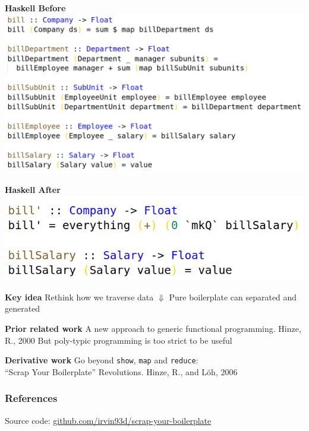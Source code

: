 \documentclass[14pt]{beamer}
\begin{document}
\begin{frame}
  \textbf{Haskell Before}
  \vfill
  \includegraphics[height=0.8\textheight,width=\textwidth,keepaspectratio]{graphics/bill-naive-hs.png}
  \vfill
\end{frame}

\begin{frame}
  \textbf{Haskell After}
  \vfill
  \includegraphics[height=0.8\textheight,width=\textwidth,keepaspectratio]{graphics/bill-hs.png}
  \vfill
\end{frame}

\begin{frame}
  \vfill
  \textbf{Key idea}
  \vfill
  \centering
  Rethink how we traverse data
  \vfill
  $\Downarrow$
  \vfill
  Pure boilerplate can separated and generated
  \vfill
\end{frame}

\begin{frame}
  \textbf{Prior related work}
  \vfill
  A new approach to generic functional programming. Hinze, R., 2000 \cite{hinze2000new}
  \vfill
  \small{But poly-typic programming is too strict to be useful}
  \vfill
\end{frame}

\begin{frame}
  \textbf{Derivative work}
  \vfill
  Go beyond \texttt{show}, \texttt{map} and \texttt{reduce}:\\
  \vfill
  ``Scrap Your Boilerplate'' Revolutions. Hinze, R., and L\"{o}h, 2006 \cite{hinze2006scrap}
  \vfill
\end{frame}

\begin{frame}[fragile]\frametitle{References}
  
  \small{Source code: \href{https://github.com/irvin93d/scrap-your-boilerplate}{github.com/irvin93d/scrap-your-boilerplate}}
\end{frame}
\end{document}
